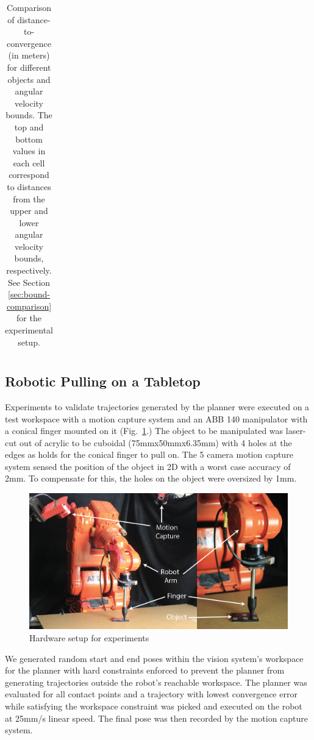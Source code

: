 \documentclass[conference]{IEEEtran}
\begin{document}
\begin{table}[t]
\begin{center}
\begin{tabular}[c]{cccc}
        \bottomrule
      \end{tabular}
  \end{center}
  \caption{Comparison of distance-to-convergence (in meters) for different objects and angular velocity bounds. The top and bottom values in each cell correspond to distances from the upper and lower angular velocity bounds, respectively. See Section \ref{sec:bound-comparison} for the experimental setup.}
  \label{table:convergence-distance}
\end{table}

\subsection{Robotic Pulling on a Tabletop}
Experiments to validate trajectories generated by the planner were executed on a test workspace with a motion capture system and an ABB 140 manipulator with a conical finger mounted on it (Fig.~\ref{fig:hardware}.) The object to be manipulated was laser-cut out of acrylic to be cuboidal (75mmx50mmx6.35mm) with 4 holes at the edges as holds for the conical finger to pull on. The 5 camera motion capture system sensed the position of the object in 2D with a worst case accuracy of 2mm. To compensate for this, the holes on the object were oversized by 1mm.

\begin{figure}
\begin{center}
  \includegraphics[width=\columnwidth]{fig/hardware.png}
\end{center}
\caption{Hardware setup for experiments}
\label{fig:hardware}
\end{figure}
We generated random start and end poses within the vision system's workspace for the planner with hard constraints enforced to prevent the planner from generating trajectories outside the robot's reachable workspace.  
The planner was evaluated for all contact points and a trajectory with lowest convergence error while satisfying the workspace constraint was picked and executed on the robot at 25mm/s linear speed. The final pose was then recorded by the motion capture system.
\end{document}
